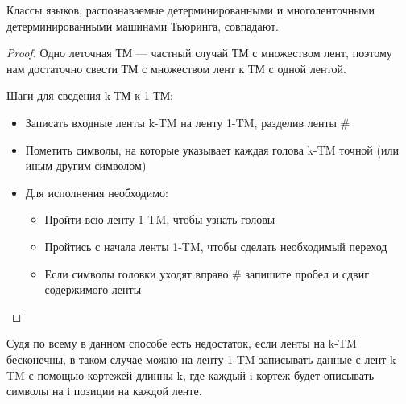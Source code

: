     \begin{Thm}
    Классы языков, распознаваемые детерминированными и многоленточными детерминированными машинами Тьюринга, совпадают.
    \end{Thm}
    \begin{proof}
        \par Одно леточная ТМ --- частный случай ТМ с множеством лент, поэтому нам достаточно свести ТМ с множеством лент к ТМ с одной лентой.
        \par Шаги для сведения k-ТМ к 1-ТМ:
        \begin{itemize}
            \item Записать входные ленты k-TM на ленту 1-TM, разделив ленты \#
            \item Пометить символы, на которые указывает каждая голова k-TM точной (или иным другим символом)
            \item Для исполнения необходимо:
                \begin{itemize}
                    \item Пройти всю ленту 1-TM, чтобы узнать головы
                    \item Пройтись с начала ленты 1-TM, чтобы сделать необходимый переход
                    \item Если символы головки уходят вправо \# запишите пробел и сдвиг содержимого ленты
                \end{itemize}
        \end{itemize}
    \end{proof}

        
    \begin{Rem}
        Судя по всему в данном способе есть недостаток, если ленты на k-TM бесконечны, в таком случае можно на ленту 1-TM записывать данные с лент k-TM с помощью кортежей длинны k, где каждый i кортеж будет описывать символы на i позиции на каждой ленте.
    \end{Rem}

